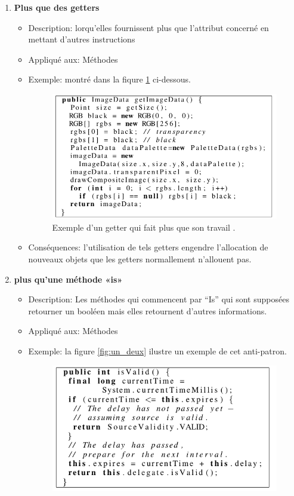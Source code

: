 \begin{enumerate}
    

\item \textbf{Plus que des getters} 
\begin{itemize}
\item Description: lorqu’elles fournissent plus que l’attribut concerné en mettant d’autres instructions
\item Appliqué aux: Méthodes
\item Exemple: montré dans la fiqure \ref{fig:un_un} ci-dessous.
	\begin{figure}[H]
	\centering
\includegraphics[width=0.9\linewidth]{Others/Resources/un_un.png}
	\caption{Exemple d'un getter qui fait plus que son travail \cite{arnaoudova2013new}.}
		\label{fig:un_un}
	\end{figure}
\item Conséquences: l’utilisation de tels getters engendre l’allocation de nouveaux objets que les getters normallement n’allouent pas.
\end{itemize}
\item \textbf{plus qu’une méthode «is»}
\begin{itemize}
\item Description: Les méthodes qui commencent par “Is” qui sont supposées retourner un booléen mais elles retournent d’autres informations.
\item Appliqué aux: Méthodes
\item Exemple: la figure \ref{fig:un_deux} ilustre un exemple de cet anti-patron.
	\begin{figure}[H]
	\centering
\includegraphics[width=0.9\linewidth]{Others/Resources/un_deux.png}

\end{figure}
\end{itemize}
\end{enumerate}
